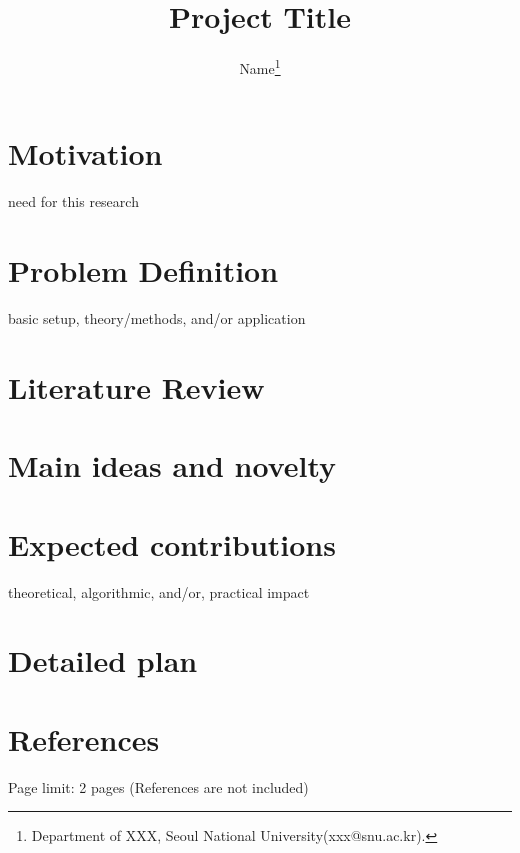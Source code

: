 \documentclass[10pt]{article}
\title{Project Title}
\author{
Name\thanks{Department of XXX, Seoul National University({xxx@snu.ac.kr}). }
}
\date{}
\begin{document}
\maketitle







\section{Motivation}

need for this research



\section{Problem Definition}

basic setup,
theory/methods, and/or
application

\section{Literature Review}

\section{Main ideas and novelty}



\section{Expected contributions}

theoretical, algorithmic, and/or, practical impact

\section{Detailed plan}

\section{References}
Page limit: 2 pages (References are not included)
\end{document}
